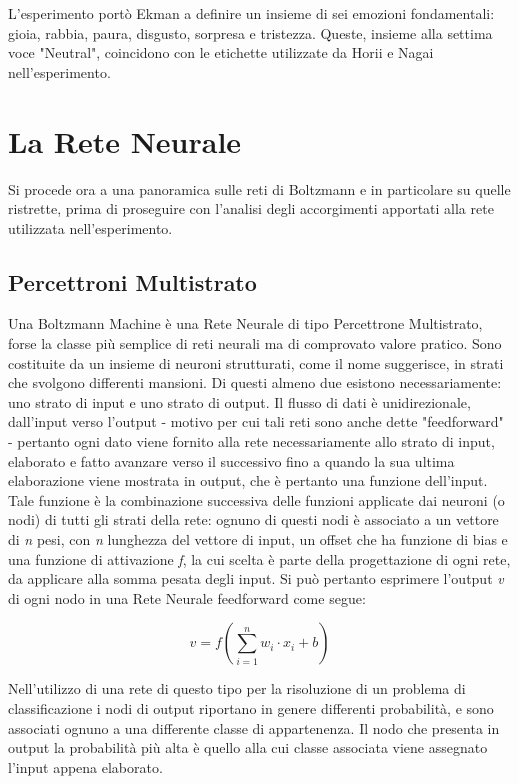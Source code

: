 \documentclass[10pt,letterpaper]{article}
\begin{document}
L'esperimento portò Ekman a definire un insieme di sei emozioni fondamentali: gioia, rabbia, paura, disgusto, sorpresa e tristezza. Queste, insieme alla settima voce "Neutral", coincidono con le etichette utilizzate da Horii e Nagai nell'esperimento.

\newpage
\section{La Rete Neurale}

Si procede ora a una panoramica sulle reti di Boltzmann e in particolare su quelle ristrette, prima di proseguire con l'analisi degli accorgimenti apportati alla rete utilizzata nell'esperimento.

\subsection{Percettroni Multistrato}
Una Boltzmann Machine è una Rete Neurale di tipo Percettrone Multistrato, forse la classe più semplice di reti neurali ma di comprovato valore pratico. Sono costituite da un insieme di neuroni strutturati, come il nome suggerisce, in strati che svolgono differenti mansioni. Di questi almeno due esistono necessariamente: uno strato di input e uno strato di output. Il flusso di dati è unidirezionale, dall'input verso l'output - motivo per cui tali reti sono anche dette "feedforward" - pertanto ogni dato viene fornito alla rete necessariamente allo strato di input, elaborato e fatto avanzare verso il successivo fino a quando la sua ultima elaborazione viene mostrata in output, che è pertanto una funzione dell'input. Tale funzione è la combinazione successiva delle funzioni applicate dai neuroni (o nodi) di tutti gli strati della rete: ognuno di questi nodi è associato a un vettore di \textit{n} pesi, con \textit{n} lunghezza del vettore di input, un offset che ha funzione di bias e una funzione di attivazione \textit{f}, la cui scelta è parte della progettazione di ogni rete, da applicare alla somma pesata degli input. Si può pertanto esprimere l'output \textit{v} di ogni nodo in una Rete Neurale feedforward come segue:

\begin{equation}
v = f(\sum_{i =1}^{n}w_i\cdot{x_i}+b)
\end{equation}

Nell'utilizzo di una rete di questo tipo per la risoluzione di un problema di classificazione i nodi di output riportano in genere differenti probabilità, e sono associati ognuno a una differente classe di appartenenza. Il nodo che presenta in output la probabilità più alta è quello alla cui classe associata viene assegnato l'input appena elaborato.
\end{document}
